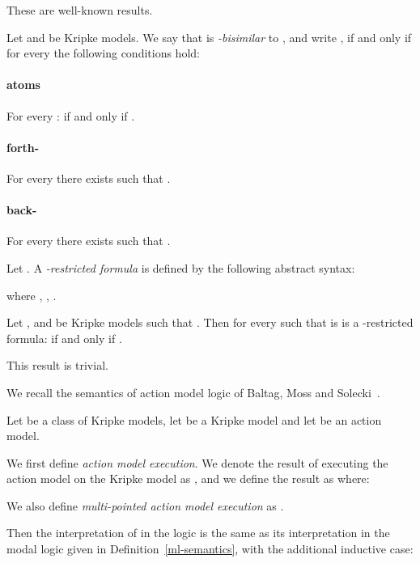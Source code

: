 \documentclass[twoside]{aiml14}
\begin{document}
  These are well-known results.

  \begin{definition}
      Let  
      and 
      be Kripke models. 
      We say that  is {\em -bisimilar}
      to ,
      and write ,
      if and only if for every  the following conditions hold:

      \paragraph{atoms}
      For every :  if and only if .

      \paragraph{forth-}
      For every  
      there exists 
      such that .

      \paragraph{back-}
      For every 
      there exists  
      such that  .
  \end{definition}

  \begin{definition}\label{b-restricted-formulae}
      Let . A {\em -restricted formula} is defined by the following abstract syntax:
      
      where , , .
  \end{definition}

  \begin{proposition}
      Let ,
      and  be Kripke models such that
      . 
      Then for every  such that  is is a -restricted formula:
       if and only if .
  \end{proposition}

  This result is trivial.

  We recall the semantics of action model logic of Baltag, Moss and Solecki~\cite{baltag1998,baltag2005}.

  \begin{definition}\label{aml-semantics}
  Let \classC{} be a class of Kripke models, let  be a Kripke model and let  be an action
  model.

  We first define {\em action model execution}. 
  We denote the result of executing the action model  
  on the Kripke model  as , 
  and we define the result as 
   where:
   

  We also define {\em multi-pointed action model execution} as 
  .

  Then the interpretation of  in the logic \logicAmlC{} is
  the same as its interpretation in the modal logic \logicC{} given in
  Definition~\ref{ml-semantics}, with the additional inductive case: 
  
  \end{definition}
\end{document}
